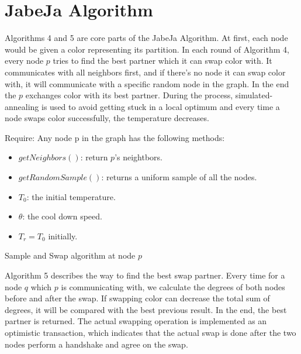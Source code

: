 \section{JabeJa Algorithm}
Algorithms 4 and 5 are core parts of the JabeJa Algorithm. At first, each node would be given a color representing its partition. In each round of Algorithm 4, every node $p$ tries to find the best partner which it can swap color with. It communicates with all neighbors first, and if there's no node it can swap color with, it will communicate with a specific random node in the graph. In the end the $p$ exchanges color with its best partner. During the process, simulated-annealing is used to avoid getting stuck in a local optimum and every time a node swaps color successfully, the temperature decreases.
\begin{algorithm}
    Require: Any node p in the graph has the following methods:
    \begin{itemize}
        \item $getNeighbors()$: return $p$'s neightbors.
        \item $getRandomSample()$: returns a uniform sample of all the nodes.
        \item $T_0$: the initial temperature.
        \item $\theta$: the cool down speed.
        \item $T_r = T_0$ initially.
    \end{itemize}
    \caption{Sample and Swap algorithm at node $p$}
\end{algorithm}
Algorithm 5 describes the way to find the best swap partner. Every time for a node $q$ which $p$ is communicating with, we calculate the degrees of both nodes before and after the swap. If swapping color can decrease the total sum of degrees, it will be compared with the best previous result. In the end, the best partner is returned. The actual swapping operation is implemented as an optimistic transaction, which indicates that the actual swap is done after the two nodes perform a handshake and agree on the swap.
